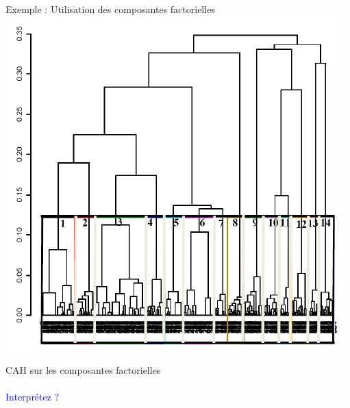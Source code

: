 \documentclass[11pt]{beamer}
\begin{document}
\begin{frame}{Exemple : Utilisation des composantes factorielles}
\centering 
 \includegraphics[scale=.4]{ACM4} 

\centering CAH sur les composantes factorielles \\~\\

\textcolor{blue}{Interprétez ?}

\end{frame}
\end{document}
